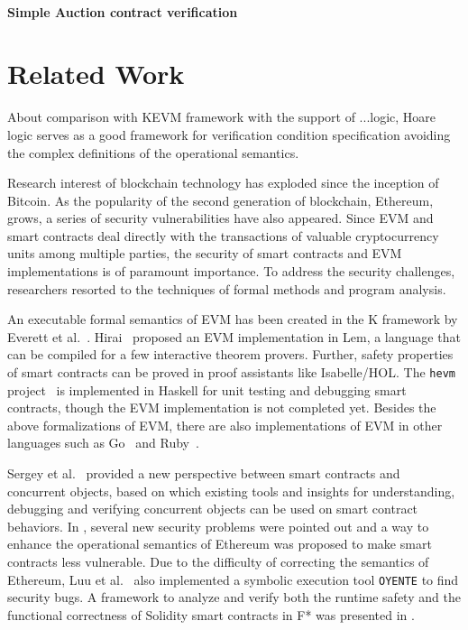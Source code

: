 \documentclass[runningheads]{llncs}
\newcommand {\xy} {\color{purple}}
\begin{document}
{\xy
\paragraph{Simple Auction contract verification}

}


\section{Related Work}\label{Sec: Related}
{\xy About comparison with KEVM framework with the support
of ...logic, Hoare logic serves as a good framework for
verification condition specification avoiding the complex definitions
of the operational semantics.}

Research interest of blockchain technology has exploded since the inception of Bitcoin. As the popularity of the second generation of blockchain, Ethereum, grows, a series of security vulnerabilities have also appeared. Since EVM and smart contracts deal directly with the transactions of valuable cryptocurrency units among multiple parties, the security of smart contracts and EVM implementations is of paramount importance. To address the security challenges, researchers resorted to the techniques of formal methods and program analysis. 

An executable formal semantics of EVM has been created in the K framework by Everett et al.~\cite{hildenbrandt2017kevm}. Hirai~\cite{hirai2017defining} proposed an EVM implementation in Lem, a language that can be compiled for a few interactive theorem provers. Further, safety properties of smart contracts can be proved in proof assistants like Isabelle/HOL. The \texttt{hevm} project~\cite{hevm} is implemented in Haskell for unit testing and debugging smart contracts, though the EVM implementation is not completed yet. Besides the above formalizations of EVM, there are also implementations of EVM in other languages such as %
Go~\cite{vmgo} and Ruby~\cite{cryptape}.

Sergey et al.~\cite{sergey2017concurrent} provided a new perspective between smart contracts and concurrent objects, based on which existing tools and insights for understanding, debugging and verifying concurrent objects can be used on smart contract behaviors. In \cite{luu2016making}, several new security problems were pointed out and a way to enhance the operational semantics of Ethereum was proposed to make smart contracts less vulnerable. Due to the difficulty of correcting the semantics of Ethereum, Luu et al.~\cite{luu2016making} also implemented a symbolic execution tool \texttt{OYENTE} to find security bugs. A framework to analyze and verify both the runtime safety and the functional correctness of Solidity smart contracts in F* was presented in \cite{bhargavan2016formal}.
\end{document}
